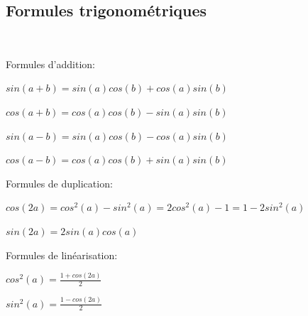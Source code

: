 \documentclass[a4paper,11pt]{article}
\theoremstyle{break}
\begin{document}
\subsection{Formules trigonométriques}

\begin{theorem}
~

 Formules d'addition:
 
 $sin(a+b)=sin(a)cos(b)+cos(a)sin(b)$
 
 $cos(a+b)=cos(a)cos(b)-sin(a)sin(b)$
 
 $sin(a-b)=sin(a)cos(b)-cos(a)sin(b)$
  
 $cos(a-b)=cos(a)cos(b)+sin(a)sin(b)$
 \vspace{0.5cm}
 
 Formules de duplication:
 
 $cos(2a)=cos^2(a)-sin^2(a)=2cos^2(a)-1=1-2sin^2(a)$
 
 $sin(2a)=2sin(a)cos(a)$
 \vspace{0.5cm}
 
 Formules de linéarisation:
  
 $cos^2(a)=\frac{1+cos(2a)}{2}$
 
 $sin^2(a)=\frac{1-cos(2a)}{2}$
\end{theorem}
   
\end{document}
